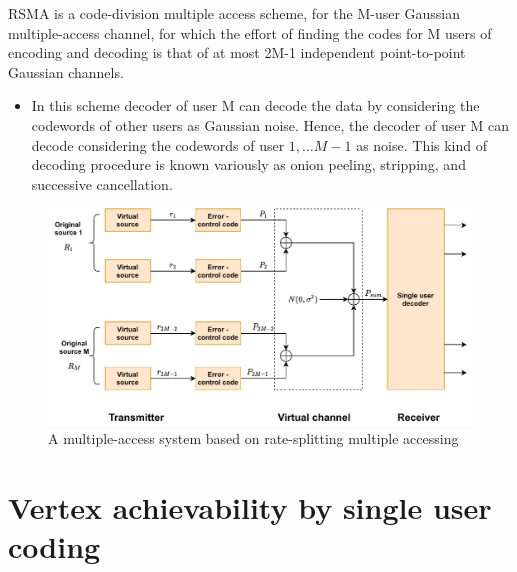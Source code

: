 \documentclass{article}
\begin{document}
RSMA is a code-division multiple access scheme, for the M-user Gaussian multiple-access channel, for which the effort of finding the codes for M users of encoding and decoding is that of at most 2M-1 independent point-to-point Gaussian channels.
\begin{itemize}
	\item In this scheme decoder of user M can decode the data by considering the codewords of other users as Gaussian noise. Hence, the decoder of user M can decode considering the codewords of user $1, \dots M-1$ as noise. This kind of decoding procedure is known variously as onion peeling, stripping, and successive cancellation.
\end{itemize}
 \begin{center}
	\begin{figure}[htb!]
		\centering
		\includegraphics[height=.35\textheight]{pic_2.pdf}		
		\caption{A multiple-access system based on rate-splitting multiple accessing}
		\label{fig2}
	\end{figure}
\end{center}
\newpage
\section{Vertex achievability by single user coding}
\end{document}
